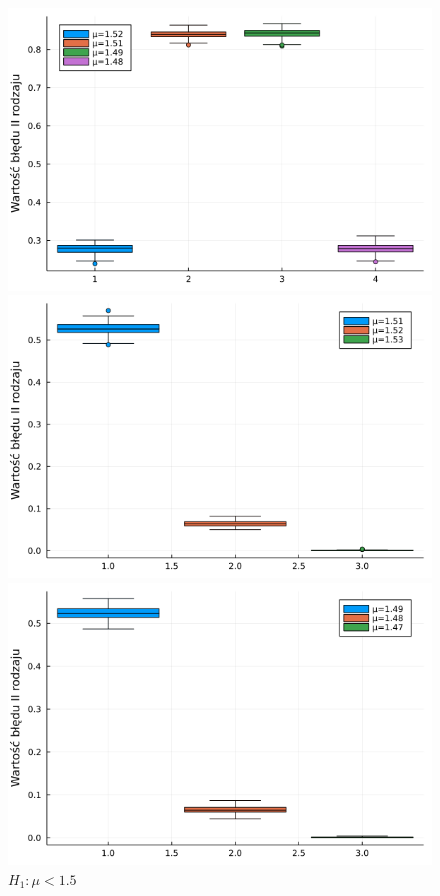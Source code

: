 \documentclass{article}
\theoremstyle{break}
\begin{document}
\begin{figure}[H]
\begin{multicols}{3}
		\includegraphics[scale=0.25]{Z3.mu1.png}
		\caption{$H_1: \mu\ne1.5$}
		\label{fig:8}
		\includegraphics[scale=0.25]{Z3.mu2.png}
		\caption{$H_1: \mu>1.5$}
		\label{fig:9}
		\includegraphics[scale=0.25]{Z3.mu3.png}
		\caption{$H_1: \mu<1.5$}
		\label{fig:10}
\end{multicols}
\end{figure}
\end{document}
